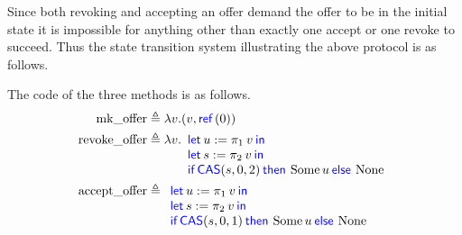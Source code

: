 Since both revoking and accepting an offer demand the offer to be in the initial state it is impossible for anything other than exactly one accept or one revoke to succeed.
Thus the state transition system illustrating the above protocol is as follows.
\begin{center}
\end{center}
The code of the three methods is as follows.
\newcommand{\mkoffer}{\operatorname{mk\_offer}}
\newcommand{\revoke}{\operatorname{revoke\_offer}}
\newcommand{\accept}{\operatorname{accept\_offer}}
\begin{align*}
  \mkoffer &\eqdef \lambda v. (v, \Ref(0))\\
  \revoke &\eqdef \lambda v. \begin{array}[t]{l}
                               \Let u = \Proj{1}v in\\
                               \Let s = \Proj{2}v in\\
                               \If \CAS(s, 0, 2) then \Some u \Else \None
                             \end{array}\\
  \accept &\eqdef \begin{array}[t]{l}
                    \Let u = \Proj{1}v in\\
                    \Let s = \Proj{2}v in\\
                    \If \CAS(s, 0, 1) then \Some u \Else \None
                  \end{array}
\end{align*}


